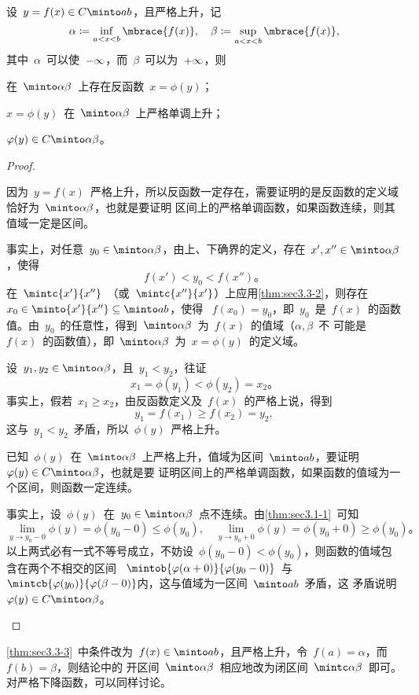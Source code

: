 \begin{theorem}\label{thm:sec3.3-3}
设~$y=f(x)\in C\minto ab$，且严格上升，记
\[
  \alpha\coloneq\inf_{a<x<b}\mbrace{f(x)},\quad\beta\coloneq\sup_{a<x<b}\mbrace{f(x)},
\]
其中~$\alpha$~可以使~$-\infty$，而~$\beta$~可以为~$+\infty$，则
\begin{enumlistcols}
\item 在~$\minto\alpha\beta$~上存在反函数~$x=\phi(y)$；
\item $x=\phi(y)$~在~$\minto\alpha\beta$~上严格单调上升；
\item $\phi(y)\in C\minto\alpha\beta$。
\end{enumlistcols}
\end{theorem}
\begin{proof}
\begin{thmenumlist}
\item 因为~$y=f(x)$~严格上升，所以反函数一定存在，需要证明的是反函数的定义域恰好为~$\minto\alpha\beta$，也就是要证明
区间上的严格单调函数，如果函数连续，则其值域一定是区间。

事实上，对任意~$y_0\in\minto\alpha\beta$，由上、下确界的定义，存在~$x',x''\in\minto\alpha\beta$，使得
\[
  f(x')<y_0<f(x'')。
\]
在~$\mintc{x'}{x''}$~（或~$\mintc{x''}{x'}$）上应用\ref{thm:sec3.3-2}，则存在~$x_0\in\minto{x'}{x''}\subset\minto ab$，使得
~$f(x_0)=y_0$，即~$y_0$~是~$f(x)$~的函数值。由~$y_0$~的任意性，得到~$\minto\alpha\beta$~为~$f(x)$~的值域（$\alpha,\beta$~不
可能是~$f(x)$~的函数值），即~$\minto\alpha\beta$~为~$x=\phi(y)$~的定义域。
\item 设~$y_1,y_2\in\minto\alpha\beta$，且~$y_1<y_2$，往证
\[
  x_1=\phi(y_1)<\phi(y_2)=x_2 。
\]
事实上，假若~$x_1\geq x_2$，由反函数定义及~$f(x)$~的严格上说，得到
\[
  y_1=f(x_1)\geq f(x_2)=y_2,
\]
这与~$y_1<y_2$~矛盾，所以~$\phi(y)$~严格上升。
\item 已知~$\phi(y)$~在~$\minto\alpha\beta$~上严格上升，值域为区间~$\minto ab$，要证明~$\phi(y)\in C\minto\alpha\beta$，也就是要
证明区间上的严格单调函数，如果函数的值域为一个区间，则函数一定连续。

事实上，设~$\phi(y)$~在~$y_0\in\minto\alpha\beta$~点不连续。由\ref{thm:sec3.1-1}~可知
\[
  \lim_{y\to y_0-0}\phi(y)=\phi(y_0-0)\leq\phi(y_0),\quad
  \lim_{y\to y_0+0}\phi(y)=\phi(y_0+0)\geq\phi(y_0)。
\]
以上两式必有一式不等号成立，不妨设~$\phi(y_0-0)<\phi(y_0)$，则函数的值域包含在两个不相交的区间
~$\mintob{\phi(\alpha+0)}{\phi(y_0-0)}$~与~$\mintcb{\phi(y_0)}{\phi(\beta-0)}$内，这与值域为一区间~$\minto ab$~矛盾，这
矛盾说明~$\phi(y)\in C\minto\alpha\beta$。\qedhere
\end{thmenumlist}
\end{proof}
\begin{remark}\label{rem:sec3.3-1}
\ref{thm:sec3.3-3}~中条件改为~$f(x)\in\minto ab$，且严格上升，令~$f(a)=\alpha$，而~$f(b)=\beta$，则结论中的
开区间~$\minto\alpha\beta$~相应地改为闭区间~$\mintc\alpha\beta$~即可。对严格下降函数，可以同样讨论。
\end{remark}

